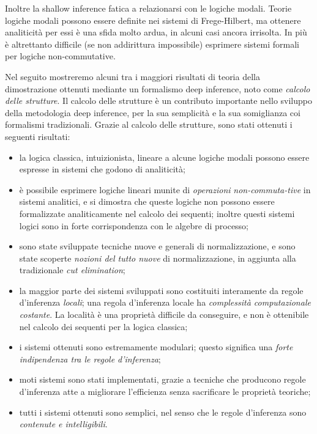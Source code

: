 \documentclass[12pt,a4paper,openright,twoside]{report}
\begin{document}
Inoltre la shallow inference fatica a relazionarsi con le logiche modali. Teorie logiche modali possono essere definite nei sistemi di Frege-Hilbert, ma ottenere analiticit\`a per essi \`e una sfida molto ardua, in alcuni casi ancora irrisolta. In pi\`u \`e altrettanto difficile (se non addirittura impossibile) esprimere sistemi formali per logiche non-commutative.

Nel seguito mostreremo alcuni tra i maggiori risultati di teoria della dimostrazione ottenuti mediante un formalismo deep inference, noto come \emph{calcolo delle strutture}. Il calcolo delle strutture \`e un contributo importante nello sviluppo della metodologia deep inference, per la sua semplicit\`a e la sua somiglianza coi formalismi tradizionali. Grazie al calcolo delle strutture, sono stati ottenuti i seguenti risultati:
\begin{itemize}
	\item la logica classica, intuizionista, lineare a alcune logiche modali possono essere espresse in sistemi che godono di analiticit\`a;
	\item \`e possibile esprimere logiche lineari munite di \emph{operazioni} \emph{non-commuta-tive} in sistemi analitici, e si dimostra che queste logiche non possono essere formalizzate analiticamente nel calcolo dei sequenti; inoltre questi sistemi logici sono in forte corrispondenza con le algebre di processo;
	\item sono state sviluppate tecniche nuove e generali di normalizzazione, e sono state scoperte \emph{nozioni del tutto nuove} di normalizzazione, in aggiunta alla tradizionale \emph{cut elimination};
	\item la maggior parte dei sistemi sviluppati sono costituiti interamente da regole d'inferenza \emph{locali}; una regola d'inferenza locale ha \emph{complessit\`a computazionale costante}. La localit\`a \`e una propriet\`a difficile da conseguire, e non \`e ottenibile nel calcolo dei sequenti per la logica classica;
	\item i sistemi ottenuti sono estremamente modulari; questo significa una \emph{forte indipendenza tra le regole d'inferenza};
	\item moti sistemi sono stati implementati, grazie a tecniche che producono regole d'inferenza atte a migliorare l'efficienza senza sacrificare le propriet\`a teoriche;
	\item tutti i sistemi ottenuti sono semplici, nel senso che le regole d'inferenza sono \emph{contenute e intelligibili}.
\end{itemize}
\end{document}
